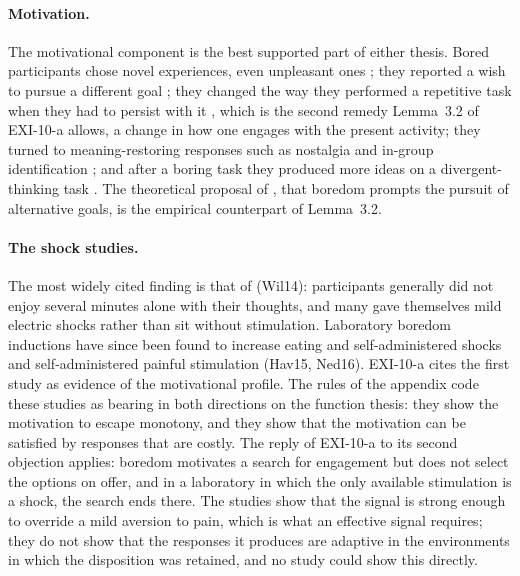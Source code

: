 \documentclass{situationist-preprint}
\begin{document}
\paragraph{Motivation.} The motivational component is the best supported part of either thesis. Bored participants chose novel experiences, even unpleasant ones \citep{BenchLench2019}; they reported a wish to pursue a different goal \citep{vanTilburgIgou2012,vanTilburgIgou2017}; they changed the way they performed a repetitive task when they had to persist with it \citep{Sansone1992}, which is the second remedy Lemma~3.2 of EXI-10-a allows, a change in how one engages with the present activity; they turned to meaning-restoring responses such as nostalgia \citep{vanTilburgIgouSedikides2013} and in-group identification \citep{vanTilburgIgou2011}; and after a boring task they produced more ideas on a divergent-thinking task \citep{MannCadman2014}. The theoretical proposal of \citet{BenchLench2013}, that boredom prompts the pursuit of alternative goals, is the empirical counterpart of Lemma~3.2.

\paragraph{The shock studies.} The most widely cited finding is that of \citet{WilsonEtAl2014} (Wil14): participants generally did not enjoy several minutes alone with their thoughts, and many gave themselves mild electric shocks rather than sit without stimulation. Laboratory boredom inductions have since been found to increase eating and self-administered shocks \citep{Havermans2015} and self-administered painful stimulation \citep{Nederkoorn2016} (Hav15, Ned16). EXI-10-a cites the first study as evidence of the motivational profile. The rules of the appendix code these studies as bearing in both directions on the function thesis: they show the motivation to escape monotony, and they show that the motivation can be satisfied by responses that are costly. The reply of EXI-10-a to its second objection applies: boredom motivates a search for engagement but does not select the options on offer, and in a laboratory in which the only available stimulation is a shock, the search ends there. The studies show that the signal is strong enough to override a mild aversion to pain, which is what an effective signal requires; they do not show that the responses it produces are adaptive in the environments in which the disposition was retained, and no study could show this directly.
\end{document}

